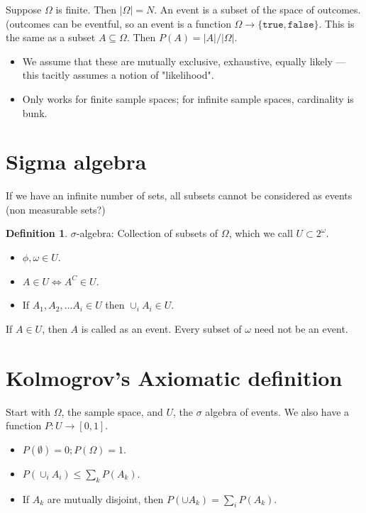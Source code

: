 \documentclass{book}
\theoremstyle{definition}
\newtheorem{definition}[theorem]{Definition}
\begin{document}
Suppose $\Omega$ is finite. Then $|\Omega| = N$. An event is a subset of the space of outcomes.
(outcomes can be eventful, so an event is a function $\Omega \rightarrow \{ \texttt{true}, \texttt{false} \}$.
This is the same as a subset $A \subseteq \Omega$.  Then $P(A) = |A|/|\Omega|$.

\begin{itemize}
\item We assume that these are mutually exclusive, exhaustive, equally likely
--- this tacitly assumes a notion of "likelihood".
\item Only works for finite sample spaces; for infinite sample spaces, cardinality is bunk.
\end{itemize}

\section{Sigma algebra}

If we have an infinite number of sets, all subsets cannot be considered as events
(non measurable sets?)

\begin{definition}
$\sigma$-algebra: Collection of subsets of $\Omega$, which we call $U \subset 2^{\omega}$.
\begin{itemize}
\item $\phi, \omega \in U$.
\item $A \in U \iff A^C \in U$.
\item If $A_1, A_2, \dots A_i \in U$ then $\cup_i A_i \in U$.
\end{itemize}
\end{definition}

If $A \in U$, then $A$ is called as an event. Every subset of $\omega$ need not
be an event.

\section{ Kolmogrov's Axiomatic definition}

Start with $\Omega$, the sample space, and $U$, the $\sigma$ algebra of events.
We also have a function $P: U \rightarrow [0, 1]$.

\begin{itemize}
\item $P(\emptyset) = 0; P(\Omega) = 1$.
\item $P(\cup_i A_i) \leq \sum_k P(A_k)$.
\item If $A_k$ are mutually disjoint, then $P(\cup A_k) = \sum_i P(A_k)$.
\end{itemize}
\end{document}
